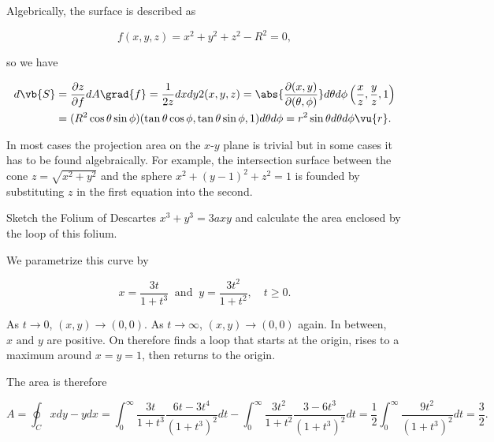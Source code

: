 \documentclass[english,a4paper,12pt]{report}
\begin{document}
Algebrically, the surface is described as 

\begin{equation}
	f(x,y,z) = x^2+y^2+z^2 - R^2 = 0,
\end{equation}

so we have

\begin{equation}
	\begin{aligned} 
	d\vb{S} &= \frac{\partial z}{\partial f} dA \grad{f} = \frac{1}{2z} dxdy 2(x,y,z) = \abs{\frac{\partial (x,y)}{\partial (\theta ,\phi )} }d \theta d\phi \left(\frac{x}{z},\frac{y}{z},1  \right) \\
	&= (R^2\cos \theta \sin \phi )(\tan \theta \cos \phi , \tan \theta \sin \phi ,1) d \theta d \phi  = r^2\sin \theta d \theta d\phi \vu{r} .
	\end{aligned} 
\end{equation}

In most cases the projection area on the \(x\)-\(y\) plane is trivial but in some cases it has to be found algebraically. For example, the intersection surface between the cone \(z = \sqrt{x^2+y^2} \) and the sphere \(x^2+(y-1)^2+z^2=1\) is founded by substituting \(z\)  in the first equation into the second.  

{Sketch the Folium of Descartes \(x^3 +y^3 = 3axy\) and calculate the area enclosed by the loop of this folium. }
{We parametrize this curve by 

\begin{equation}
	 x= \frac{3t}{1+t^3 } ~\text { and }~ y = \frac{3t^2}{1+t^2}, \quad t \ge 0.  
\end{equation}

As \(t \to 0\), \((x,y) \to (0,0)\). As \(t \to \infty\), \((x,y) \to (0,0)\) again. In between, \(x \text { and } y\) are positive. On therefore finds a loop that starts at the origin, rises to a maximum around \(x = y = 1\), then returns to the origin.

The area is therefore 

\begin{equation}
	A = \oint_{C} xdy-ydx = \int_{0}^{\infty}   \frac{3t}{1+t^3 } \frac{6t-3t^4}{(1+t^3 )^2} dt - \int_{0}^{\infty} \frac{3t^2}{1+t^2} \frac{3-6t^3 }{(1+t^3 )^2} dt = \frac{1}{2} \int_{0}^{\infty} \frac{9t^2}{(1+t^3 )^2}dt = \frac{3}{2}.     
\end{equation}
~
} 
\end{document}
